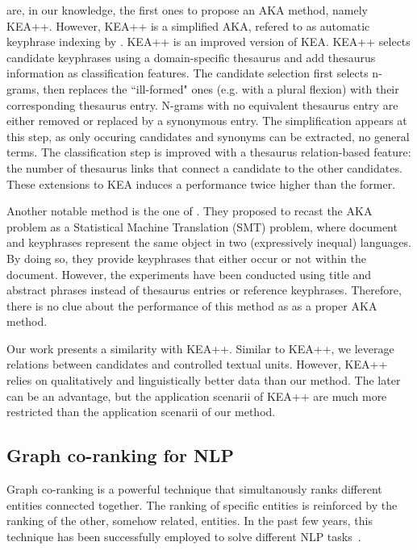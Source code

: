      are, in our knowledge, the first ones
    to propose an AKA method, namely KEA++. However, KEA++ is a simplified AKA,
    refered to as automatic keyphrase indexing by
    . KEA++ is an improved version of KEA.
    KEA++ selects candidate keyphrases using a domain-specific thesaurus and add
    thesaurus information as classification features. The candidate selection
    first selects n-grams, then replaces the ``ill-formed" ones (e.g. with a
    plural flexion) with their corresponding thesaurus entry. N-grams with no
    equivalent thesaurus entry are either removed or replaced by a synonymous
    entry. The simplification appears at this step, as only occuring candidates
    and synonyms can be extracted, no general terms. The classification step is
    improved with a thesaurus relation-based feature: the number of thesaurus
    links that connect a candidate to the other candidates. These extensions to
    KEA induces a performance twice higher than the former.

    Another notable method is the one of . They
    proposed to recast the AKA problem as a Statistical Machine Translation
    (SMT) problem, where document and keyphrases represent the same object in
    two (expressively inequal) languages. By doing so, they provide keyphrases
    that either occur or not within the document. However, the experiments have
    been conducted using title and abstract phrases instead of thesaurus entries
    or reference keyphrases. Therefore, there is no clue about the performance
    of this method as as a proper AKA method.

    Our work presents a similarity with KEA++. Similar to KEA++, we leverage
    relations between candidates and controlled textual units. However, KEA++
    relies on qualitatively and linguistically better data than our method. The
    later can be an advantage, but the application scenarii of KEA++ are much
    more restricted than the application scenarii of our method.

  \subsection{Graph co-ranking for NLP}
  \label{subsec:graph_co_ranking_for_nlp}
    Graph co-ranking is a powerful technique that simultanously ranks different
    entities connected together. The ranking of specific entities is reinforced
    by the ranking of the other, somehow related, entities. In the past few
    years, this technique has been successfully employed to solve different NLP
    tasks~\cite{wan2011corankingsummarization,liu2014corankingopinionmining}.

